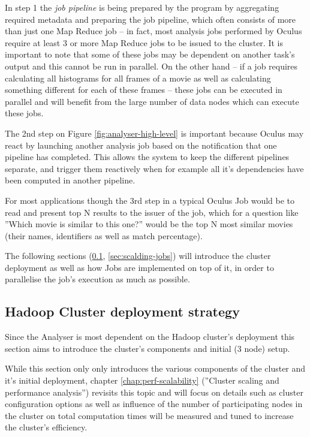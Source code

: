 In step 1 the \textit{job pipeline} is being prepared by the program by aggregating required metadata and preparing the job pipeline, which often consists of more than just one Map Reduce job -- in fact, most analysis jobs performed by Oculus require at least 3 or more Map Reduce jobs to be issued to the cluster. It is important to note that some of these jobs may be dependent on another task's output and this cannot be run in parallel. On the other hand -- if a job requires calculating all histograms for all frames of a movie as well as calculating something different for each of these frames -- these jobs can be executed in parallel and will benefit from the large number of data nodes which can execute these jobs.

The 2nd step on Figure \ref{fig:analyser-high-level} is important because Oculus may react by launching another analysis job based on the notification that one pipeline has completed. This allows the system to keep the different pipelines separate, and trigger them reactively when for example all it's dependencies have been computed in another pipeline.

For most applications though the 3rd step in a typical Oculus Job would be to read and present top N results to the issuer of the job, which for a question like ''Which movie is similar to this one?'' would be the top N most similar movies (their names, identifiers as well as match percentage).

The following sections (\ref{sec:deployment-strategy}, \ref{sec:scalding-jobs}) will introduce the cluster deployment as well as how Jobs are implemented on top of it, in order to parallelise the job's execution as much as possible.



\subsection{Hadoop Cluster deployment strategy}
\label{sec:deployment-strategy}

Since the Analyser is most dependent on the Hadoop cluster's deployment this section aims to introduce the cluster's components and initial (3 node) setup. 

While this section only only introduces the various components of the cluster and it's initial deployment, chapter \ref{chap:perf-scalability} (''Cluster scaling and performance analysis'') revisits this topic and will focus on details such as cluster configuration options as well as influence of the number of participating nodes in the cluster on total computation times will be measured and tuned to increase the cluster's efficiency.

